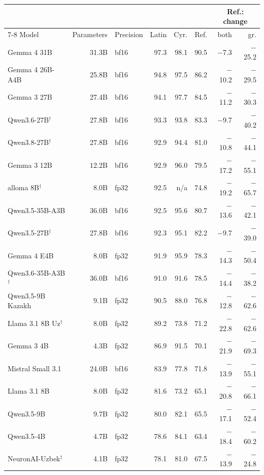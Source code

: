 \begin{table}[t]
\centering\small
\setlength{\tabcolsep}{5pt}
\begin{tabular}{@{}lrlrrrrr@{}}
\toprule
 & & & & & & \multicolumn{2}{c}{Ref.: change} \\
\cmidrule(l){7-8}
Model & Parameters & Precision & Latin & Cyr. & Ref. & both & gr. \\
\midrule
Gemma 4 31B & 31.3B & bf16 & 97.3 & 98.1 & 90.5 & $-$7.3 & $-$25.2 \\
Gemma 4 26B-A4B & 25.8B & bf16 & 94.8 & 97.5 & 86.2 & $-$10.2 & $-$29.5 \\
Gemma 3 27B & 27.4B & bf16 & 94.1 & 97.7 & 84.5 & $-$11.2 & $-$30.3 \\
Qwen3.6-27B$^\dagger$ & 27.8B & bf16 & 93.3 & 93.8 & 83.3 & $-$9.7 & $-$40.2 \\
Qwen3.8-27B$^\dagger$ & 27.8B & bf16 & 92.9 & 94.4 & 81.0 & $-$10.8 & $-$44.1 \\
Gemma 3 12B & 12.2B & bf16 & 92.9 & 96.0 & 79.5 & $-$17.2 & $-$55.1 \\
alloma 8B$^\dagger$ & 8.0B & fp32 & 92.5 & n/a & 74.8 & $-$19.2 & $-$65.7 \\
Qwen3.5-35B-A3B & 36.0B & bf16 & 92.5 & 95.6 & 80.7 & $-$13.6 & $-$42.1 \\
Qwen3.5-27B$^\dagger$ & 27.8B & bf16 & 92.3 & 95.1 & 82.2 & $-$9.7 & $-$39.0 \\
Gemma 4 E4B & 8.0B & fp32 & 91.9 & 95.9 & 78.3 & $-$14.3 & $-$50.4 \\
Qwen3.6-35B-A3B$^\dagger$ & 36.0B & bf16 & 91.0 & 91.6 & 78.5 & $-$14.4 & $-$38.2 \\
Qwen3.5-9B Kazakh & 9.1B & fp32 & 90.5 & 88.0 & 76.8 & $-$12.8 & $-$62.6 \\
Llama 3.1 8B Uz$^\dagger$ & 8.0B & fp32 & 89.2 & 73.8 & 71.2 & $-$22.8 & $-$62.6 \\
Gemma 3 4B & 4.3B & fp32 & 86.9 & 91.5 & 70.1 & $-$21.9 & $-$69.3 \\
Mistral Small 3.1 & 24.0B & bf16 & 83.9 & 77.8 & 71.8 & $-$13.9 & $-$55.1 \\
Llama 3.1 8B & 8.0B & fp32 & 81.6 & 73.2 & 65.1 & $-$20.8 & $-$66.1 \\
Qwen3.5-9B & 9.7B & fp32 & 80.0 & 82.1 & 65.5 & $-$17.1 & $-$52.4 \\
Qwen3.5-4B & 4.7B & fp32 & 78.6 & 84.1 & 63.4 & $-$18.4 & $-$60.2 \\
NeuronAI-Uzbek$^\dagger$ & 4.1B & fp32 & 78.1 & 81.0 & 67.5 & $-$13.9 & $-$24.8 \\

\end{tabular}
\end{table}
